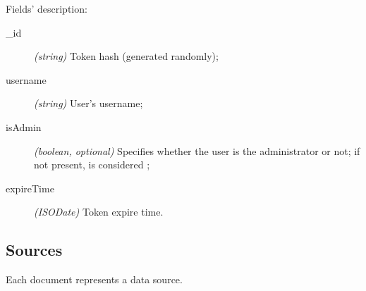 Fields' description:
\begin{description}
	\item[\_id] \textit{(string)} Token hash (generated randomly);
	\item[username] \textit{(string)} User's username;
	\item[isAdmin] \textit{(boolean, optional)} Specifies whether the user
		is the administrator or not; if not present, is considered
		;
	\item[expireTime] \textit{(ISODate)} Token expire time.
\end{description}

\subsection{Sources}

Each document represents a data source.



